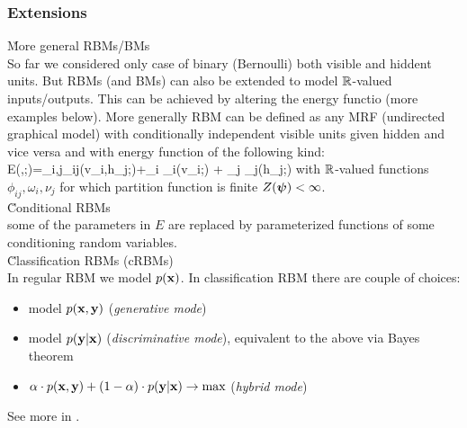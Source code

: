 \subsubsection{Extensions}
\u{More general RBMs/BMs}
\\[1em]
So far we considered only case of binary (Bernoulli) both visible and hiddent units. But RBMs (and BMs) can also be extended to model $\mathbb{R}$-valued inputs/outputs. This can be achieved by altering the energy functio (more examples below). More generally RBM can be defined as any MRF (undirected graphical model) with conditionally independent visible units given hidden and vice versa and with energy function of the following kind:
\bg
E(,;\bs{\psi})=\sum_{i,j}\phi_{ij}(v_i,h_j;\bs{\psi})+\sum_i \omega_i(v_i;\bs{\psi}) + \sum_j \nu_j(h_j;\bs{\psi})
\eg
with $\mathbb{R}$-valued functions $\phi_{ij}, \omega_i, \nu_j$ for which partition function is finite $Z(\boldsymbol{\psi})<\infty$.
\\[1em]
\u{Conditional RBMs}
\\[1em]
some of the parameters in $E$ are replaced by parameterized functions of some conditioning random variables.
\\[1em]
\u{Classification RBMs (cRBMs)}
\\[1em]
In regular RBM we model $p(\mathbf{x})$. In classification RBM there are couple of choices:
\begin{itemize}
\item model $p(\mathbf{x},\mathbf{y})$ (\emph{generative mode})
\item model $p(\mathbf{y}|\mathbf{x})$ (\emph{discriminative mode}), equivalent to the above via Bayes theorem
\item $\alpha\cdot p(\mathbf{x},\mathbf{y})+(1-\alpha)\cdot p(\mathbf{y}|\mathbf{x})\rightarrow \text{max}$ (\emph{hybrid mode})
\end{itemize}
See more in \cite{hinton2010practical}.

